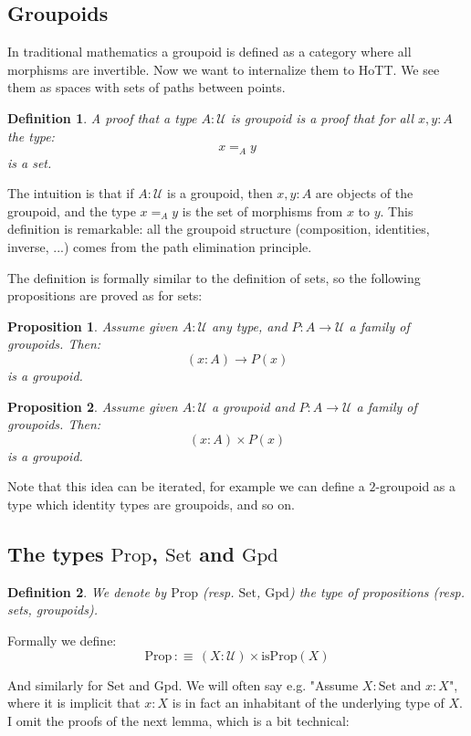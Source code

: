 \documentclass{article}
\newcommand{\sse}[1]{\medbreak \subsection{#1}}
\newcommand{\U}{{\mathcal U}}
\renewcommand{\r}{\rightarrow}
\newcommand{\Set}{\mathrm{Set}}
\newcommand{\Prop}{\mathrm{Prop}}
\newcommand{\Gpd}{\mathrm{Gpd}}
\newtheorem{definition}{Definition}
\newtheorem{proposition}{Proposition}
\begin{document}
\sse{Groupoids}

In traditional mathematics a groupoid is defined as a category where all morphisms are invertible. Now we want to internalize them to HoTT. We see them as spaces with sets of paths between points.

\begin{definition}
A proof that a type $A:\U$ is groupoid is a proof that for all $x,y:A$ the type:
\[x=_Ay\]
is a set.
\end{definition}

The intuition is that if $A:\U$ is a groupoid, then $x,y:A$ are objects of the groupoid, and the type $x=_Ay$ is the set of morphisms from $x$ to $y$.
This definition is remarkable: all the groupoid structure (composition, identities, inverse, ...) comes from the path elimination principle.

The definition is formally similar to the definition of sets, so the following propositions are proved as for sets:

\begin{proposition}
Assume given $A:\U$ any type, and $P:A\r \U$ a family of groupoids. Then:
\[(x:A)\r P(x)\]
is a groupoid.
\end{proposition}

\begin{proposition}
Assume given $A:\U$ a groupoid and $P:A\r \U$ a family of groupoids. Then:
\[(x:A)\times P(x)\]
is a groupoid.
\end{proposition}

 Note that this idea can be iterated, for example we can define a $2$-groupoid as a type which identity types are groupoids, and so on.




\sse{The types $\Prop$, $\Set$ and $\Gpd$}

\begin{definition}
We denote by $\Prop$ (resp. $\Set$, $\Gpd$) the type of propositions (resp. sets, groupoids).%
\end{definition}

Formally we define:
\[\Prop \, :\equiv\, (X:\U)\times \mathrm{isProp}(X)\]

And similarly for $\Set$ and $\Gpd$. We will often say e.g. "Assume $X:\Set$ and $x:X$", where it is implicit that $x:X$ is in fact an inhabitant of the underlying type of $X$. I omit the proofs of the next lemma, which is a bit technical:
\end{document}
